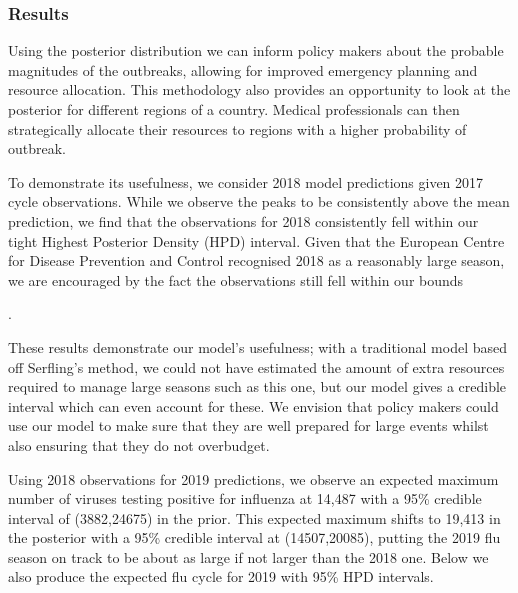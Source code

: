 \documentclass[letterpaper,10pt,english]{sphinxmanual}
\begin{document}
\subsubsection{Results}
\label{\detokenize{models/how_big:results}}
Using the posterior distribution we can inform policy makers about the
probable magnitudes of the outbreaks, allowing
for improved emergency planning and resource allocation. This methodology
also provides an opportunity to look at the posterior for different regions of a country. Medical professionals can then
strategically allocate their resources to regions with a higher probability of outbreak.

To demonstrate its usefulness, we consider 2018 model predictions given 2017 cycle observations. While we observe the peaks to be consistently above the mean prediction, we find that the observations for 2018 consistently fell within our tight Highest Posterior Density (HPD) interval. Given that the European Centre for Disease Prevention and Control recognised 2018 as a reasonably large season, we are encouraged by the fact the observations still fell within our bounds %
\begin{footnote}[4]\sphinxAtStartFootnote
{}
%
\end{footnote}.

\noindent{}

These results demonstrate our model’s usefulness; with a traditional model based off Serfling’s method, we could not have estimated the amount of extra resources required to manage large seasons such as this one, but our model gives a credible interval which can even account for these. We envision that policy makers could use our model to make sure that they are well prepared for large events whilst also ensuring that they do not overbudget.

Using 2018 observations for 2019 predictions, we observe an expected maximum number of viruses
testing positive for influenza at 14,487 with a 95\% credible interval of
(3882,24675) in the prior. This expected maximum shifts to 19,413 in the posterior
with a 95\% credible interval at (14507,20085), putting the 2019 flu season on track to be about as large if not larger than the 2018 one. Below we also produce the expected flu cycle for 2019 with 95\% HPD intervals.

\noindent{}
\end{document}
